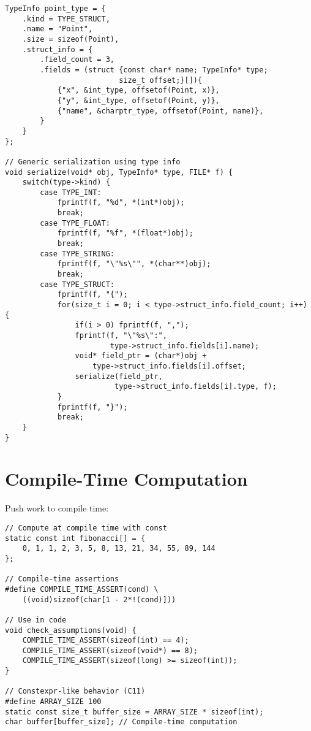 \begin{description}[style=nextline,leftmargin=0pt]
\begin{lstlisting}
TypeInfo point_type = {
    .kind = TYPE_STRUCT,
    .name = "Point",
    .size = sizeof(Point),
    .struct_info = {
        .field_count = 3,
        .fields = (struct {const char* name; TypeInfo* type;
                          size_t offset;}[]){
            {"x", &int_type, offsetof(Point, x)},
            {"y", &int_type, offsetof(Point, y)},
            {"name", &charptr_type, offsetof(Point, name)},
        }
    }
};

// Generic serialization using type info
void serialize(void* obj, TypeInfo* type, FILE* f) {
    switch(type->kind) {
        case TYPE_INT:
            fprintf(f, "%d", *(int*)obj);
            break;
        case TYPE_FLOAT:
            fprintf(f, "%f", *(float*)obj);
            break;
        case TYPE_STRING:
            fprintf(f, "\"%s\"", *(char**)obj);
            break;
        case TYPE_STRUCT:
            fprintf(f, "{");
            for(size_t i = 0; i < type->struct_info.field_count; i++) {
                if(i > 0) fprintf(f, ",");
                fprintf(f, "\"%s\":",
                        type->struct_info.fields[i].name);
                void* field_ptr = (char*)obj +
                    type->struct_info.fields[i].offset;
                serialize(field_ptr,
                         type->struct_info.fields[i].type, f);
            }
            fprintf(f, "}");
            break;
    }
}
\end{lstlisting}

\section{Compile-Time Computation}

Push work to compile time:

\begin{lstlisting}
// Compute at compile time with const
static const int fibonacci[] = {
    0, 1, 1, 2, 3, 5, 8, 13, 21, 34, 55, 89, 144
};

// Compile-time assertions
#define COMPILE_TIME_ASSERT(cond) \
    ((void)sizeof(char[1 - 2*!(cond)]))

// Use in code
void check_assumptions(void) {
    COMPILE_TIME_ASSERT(sizeof(int) == 4);
    COMPILE_TIME_ASSERT(sizeof(void*) == 8);
    COMPILE_TIME_ASSERT(sizeof(long) >= sizeof(int));
}

// Constexpr-like behavior (C11)
#define ARRAY_SIZE 100
static const size_t buffer_size = ARRAY_SIZE * sizeof(int);
char buffer[buffer_size]; // Compile-time computation
\end{lstlisting}


\end{description}
